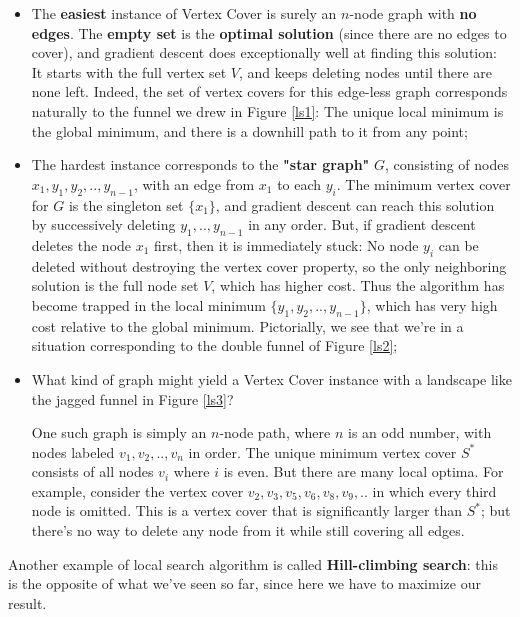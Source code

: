 \begin{itemize}
    \item The \textbf{easiest} instance of Vertex Cover is surely an $n$-node graph with \textbf{no edges}. The \textbf{empty set} is the \textbf{optimal solution} (since there are no edges to cover), and gradient descent does exceptionally well at finding this solution: It starts with the full vertex set $V$, and keeps deleting nodes until there are none left. Indeed, the set of vertex covers for this edge-less graph corresponds naturally to the funnel we drew in Figure \ref{ls1}: The unique local minimum is the global minimum, and there is a downhill path to it from any point;
    \item The hardest instance corresponds to the \textbf{"star graph"} $G$, consisting of nodes $x_1, y_1, y_2,.. , y_{n-1}$, with an edge from $x_1$ to each $y_i$. The minimum vertex cover for $G$ is the singleton set $\{x_1\}$, and gradient descent can reach this solution by successively deleting $y_1, .., y_{n-1}$ in any order. But, if gradient descent deletes the node $x_1$ first, then it is immediately stuck: No node $y_i$ can be deleted without destroying the vertex cover property, so the only neighboring solution is the full node set $V$, which has higher cost. Thus the algorithm has become trapped in the local minimum $\{y_1, y_2, .., y_{n-1}\}$, which has very high cost relative to the global minimum. Pictorially, we see that we’re in a situation corresponding to the double funnel of Figure \ref{ls2};
    \item What kind of graph might yield a Vertex Cover instance with a landscape like the jagged funnel in Figure \ref{ls3}?

    \label{ls3}
    
    One such graph is simply an $n$-node path, where $n$ is an odd number, with nodes labeled $v_1, v_2, .., v_n$ in order. The unique minimum vertex cover $S^*$ consists of all nodes $v_i$ where $i$ is even. But there are many local optima. For example, consider the vertex cover ${v_2, v_3, v_5, v_6, v_8, v_9, ..}$ in which every third node is omitted. This is a vertex cover that is significantly larger than $S^*$; but there’s no way to delete any node from it while still covering all edges.
\end{itemize}

Another example of local search algorithm is called \textbf{Hill-climbing search}: this is the opposite of what we've seen so far, since here we have to maximize our result.

